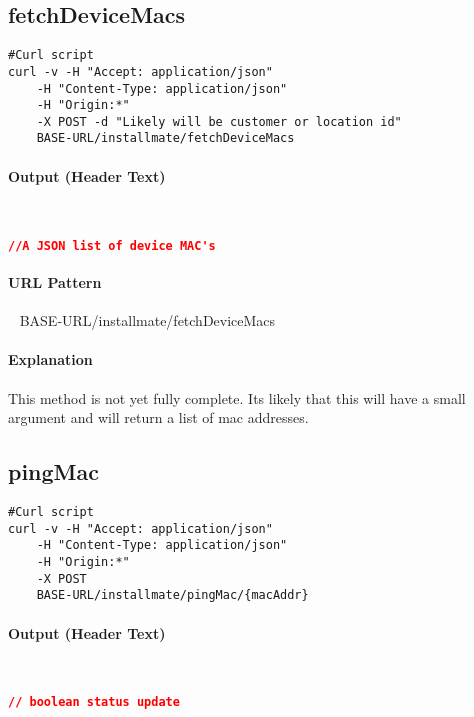 \documentclass[
10pt, %
letterpaper, %
oneside, %
headinclude,footinclude, %
BCOR5mm, %
]{scrartcl}
\begin{document}

\subsection{fetchDeviceMacs}

\begin{lstlisting}
#Curl script
curl -v -H "Accept: application/json" 
	-H "Content-Type: application/json" 
	-H "Origin:*"
	-X POST -d "Likely will be customer or location id" 
	BASE-URL/installmate/fetchDeviceMacs
\end{lstlisting}

\paragraph{Output (Header Text)}~
\begin{lstlisting}[language=json]
//A JSON list of device MAC's
\end{lstlisting}

\paragraph{URL Pattern} 
~\newline
BASE-URL/installmate/fetchDeviceMacs

\paragraph{Explanation} This method is not yet fully complete. Its likely that this will have a small argument and will return a list of mac addresses.


\subsection{pingMac}

\begin{lstlisting}
#Curl script
curl -v -H "Accept: application/json" 
	-H "Content-Type: application/json" 
	-H "Origin:*"
	-X POST 
	BASE-URL/installmate/pingMac/{macAddr}
\end{lstlisting}

\paragraph{Output (Header Text)}~
\begin{lstlisting}[language=json]
// boolean status update
\end{lstlisting}     
\end{document}
